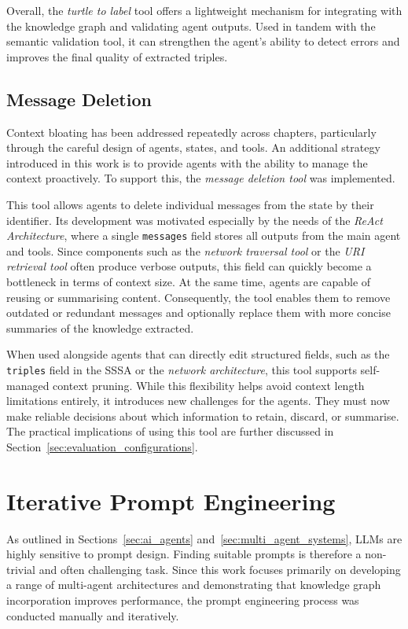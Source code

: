 \documentclass[a4paper,oneside,bibliography=totoc]{scrbook}
\begin{document}
Overall, the \textit{turtle to label} tool offers a lightweight mechanism for integrating with the knowledge graph and validating agent outputs. Used in tandem with the semantic validation tool, it can strengthen the agent’s ability to detect errors and improves the final quality of extracted triples.

\subsection{Message Deletion}
\label{subsec:message_deletion}

Context bloating has been addressed repeatedly across chapters, particularly through the careful design of agents, states, and tools. An additional strategy introduced in this work is to provide agents with the ability to manage the context proactively. To support this, the \textit{message deletion tool} was implemented.

This tool allows agents to delete individual messages from the state by their identifier. Its development was motivated especially by the needs of the \textit{ReAct Architecture}, where a single \texttt{messages} field stores all outputs from the main agent and tools. Since components such as the \textit{network traversal tool} or the \textit{URI retrieval tool} often produce verbose outputs, this field can quickly become a bottleneck in terms of context size. At the same time, agents are capable of reusing or summarising content. Consequently, the tool enables them to remove outdated or redundant messages and optionally replace them with more concise summaries of the knowledge extracted.

When used alongside agents that can directly edit structured fields, such as the \texttt{triples} field in the \ac{SSSA} or the \textit{network architecture}, this tool supports self-managed context pruning. While this flexibility helps avoid context length limitations entirely, it introduces new challenges for the agents. They must now make reliable decisions about which information to retain, discard, or summarise. The practical implications of using this tool are further discussed in Section~\ref{sec:evaluation_configurations}.

\section{Iterative Prompt Engineering}
\label{sec:iterative_prompt_engineering}

As outlined in Sections~\ref{sec:ai_agents} and~\ref{sec:multi_agent_systems}, \acp{LLM} are highly sensitive to prompt design. Finding suitable prompts is therefore a non-trivial and often challenging task. Since this work focuses primarily on developing a range of multi-agent architectures and demonstrating that knowledge graph incorporation improves performance, the prompt engineering process was conducted manually and iteratively.
\end{document}
